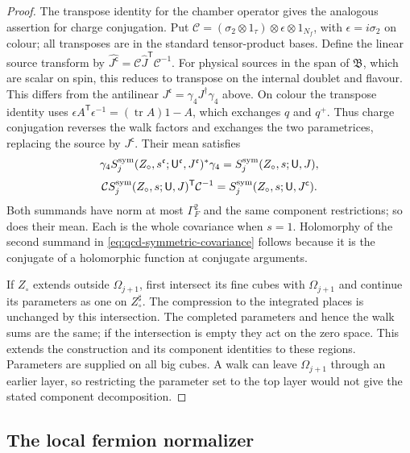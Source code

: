 \documentclass[11pt,letterpaper,reqno]{amsart}
\theoremstyle{definition}
\theoremstyle{remark}
\begin{document}
\begin{proof}
The transpose identity for the chamber operator gives the analogous
assertion for charge conjugation. Put
$\mathcal C=(\sigma_2\otimes1_\tau)\otimes\epsilon
\otimes1_{N_f}$, with $\epsilon=i\sigma_2$ on colour;
all transposes are in the standard tensor-product bases.
Define the linear source transform by
$\widehat{J^{\mathsf c}}=\mathcal C\widehat J^{\mathsf T}
\mathcal C^{-1}$. For physical sources in the span of
$\mathfrak B$, which are scalar on spin, this reduces to
transpose on the internal doublet and flavour. This differs from the antilinear
$J^{\mathfrak c}=\gamma_4J^\dagger\gamma_4$ above.
On colour the transpose identity uses
$\epsilon A^{\mathsf T}\epsilon^{-1}=(\operatorname{tr}A)1-A$,
which exchanges $q$ and $q^+$.  Thus charge conjugation reverses
the walk factors and exchanges the two parametrices, replacing
the source by $J^{\mathsf c}$. Their mean satisfies
\[
 \gamma_4S_j^{\rm sym}(Z_\circ,s^{\mathfrak c};
          \mathsf U^{\mathfrak c},J^{\mathfrak c})^*\gamma_4
      =S_j^{\rm sym}(Z_\circ,s;\mathsf U,J),
\]
\[
 \mathcal C S_j^{\rm sym}(Z_\circ,s;\mathsf U,J)^{\mathsf T}
                 \mathcal C^{-1}
      =S_j^{\rm sym}(Z_\circ,s;\mathsf U,J^{\mathsf c}).
\]
Both summands have norm at most $\Gamma_F^2$ and the same
component restrictions; so does their mean.  Each is the whole
covariance when $s=1$.  Holomorphy of the second summand in
\eqref{eq:qcd-symmetric-covariance} follows because it is the
conjugate of a holomorphic function at conjugate arguments.

If $Z_\circ$ extends outside $\Omega_{j+1}$, first intersect
its fine cubes with $\Omega_{j+1}$ and continue its parameters
as one on $Z_\circ^\sharp$.  The compression to the integrated
places is unchanged by this intersection.  The completed
parameters and hence the walk sums are the same; if the
intersection is empty they act on the zero space.  This extends
the construction and its component identities to these regions.
Parameters are supplied on all big cubes.  A walk can leave
$\Omega_{j+1}$ through an earlier layer, so restricting the
parameter set to the top layer would not give the stated
component decomposition.
\end{proof}

\subsection{The local fermion normalizer}
\end{document}
